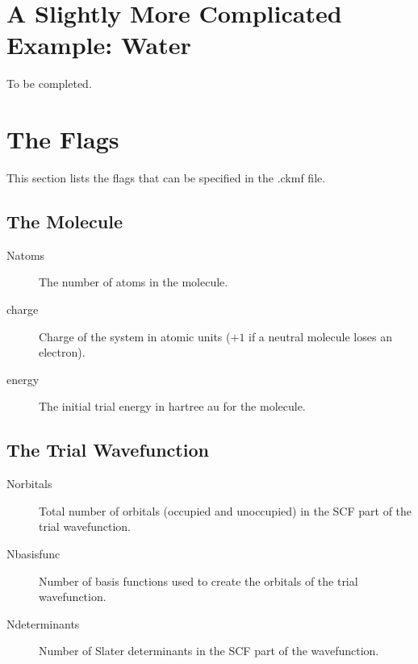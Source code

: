 \documentclass{article}
\begin{document}
\section{A Slightly More Complicated Example: Water}
To be completed.

%

\section{The Flags}
This section lists the flags that can be specified in the .ckmf file.

\subsection{The Molecule}

\begin{description}
\item [Natoms] The number of atoms in the molecule.
\item [charge] Charge of the system in atomic units ($+1$ if a neutral
  molecule loses an electron).
\item [energy] The initial trial energy in hartree au for the molecule.
\end{description}

\subsection{The Trial Wavefunction}

\begin{description}

\item [Norbitals] Total number of orbitals (occupied and unoccupied) in
  the SCF part of the trial wavefunction.

\item [Nbasisfunc] Number of basis functions used to create the
  orbitals of the trial wavefunction. 

\item [Ndeterminants] Number of Slater determinants in the SCF part of
  the wavefunction.

\end{description}
\end{document}

